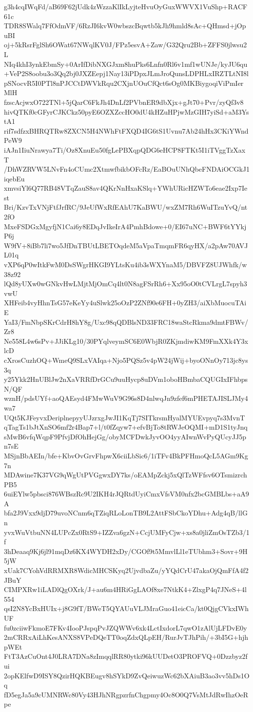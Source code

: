 g3h4cqIWqFd/aB69F62jUdk4zWzzaKlIkLyjteHvuOyGuxWWVX1VuShp+RACF61c
TDR8SWalq7FfOdmVF/6RzJI6kvW0wbszcBqwtb5kJh9hmld8sAc+QHmsd+jOpuBI
oj+5kRsrFglSh6OWat67NWqlKV0J/FPz5esvA+Zaw/G32Qru2Bb+ZFFS0jlwsu2L
NIq4khI3ynkEbmSy+0ArIfDibNXGJxm8huPks6Lnfn0Rl6v1mf1wUNJe/kyJU6qu
+VeP2S8oobu3o3Qq2bj0JXZEepj1Nay13iPDpxJLmJroQunsLDPHLxIRZTLtNI8l
pSNocvR5I0PTl8nPJCCtDWVkRqu2CXjnUOuCfQct6sOg0MKBiygoqiViPmIerMlH
fzscAcjwxO722TNl+5jQarC6FkJh4DnLf2PVbnER9dbXjx+gJt70+Pvr/zyQf3v8
hivQTKf0cGFyrCJKCkz50pyE6OZXZccHO0dU4kHZuHPjwMzGIH7yiSd+aM3YstA1
rif7sdfzxBHRQTRw8ZXCN5H4NWhFtFXQD4IG6tS1Uvnu7Ab24hHx3CKiYWndPeW9
iAJn1IiuNrawya7Ti/Oz8XnuEu50fgLePBXqpQDG6eHCP8FTKt5I1iTVggTzXaxT
/DhWZRVW5LNvFn4oCUmc2XtmwfbikbOFcRz/EaBOuUNhQbeFNDAiOCGkJ1iqebEu
xmvsiYl6Q77RB48VTqZauS8av4QKrNnHxaKSlq+YWhURicHZWTo6eae2Ixp7Iest
Bri/KzvTxVNjFtfJrfRC/9JeUfWxRfEAhU7KaBWU/wxZM7Rh6WuITzuYvQ/nt2fO
MxeFSDGxMgyfjN1Cai6y8EDqJvIkeIrA4PmhBdowe+0/EI67uNC+BWF6tYYkjP6j
W9fV+8iBb7li7wo5JfDnTBUtLBETOqdeM5aVpaTmqmFR6qyHX/a2pAw70AVJL01q
vXP6qP0wItkFwM0DsSWgrHKGI9YLtsKu4ib3sWXYnaM5/DBVFZ8UJWhfk/w38z92
lQd8yUXw0wGNkvHwLMjtMjOmCq4lt0N8agFSrRh6+Xx95oO0tCVLrgL7spyh3vwU
XHFeib4vyHhnTsG57eKeYy4uSlwk25oOzP2ZNf90e6FH+0yZH3/aiXbMuocuTAiE
YaI3/FmNbpSKrCdrH8hY8g/Uxc98qQDBlsND33FRC18waStcRkma9dmtFBWv/Zr8
Ne558L4w6sPv+JJiKLg10/30PYqlveymSC6E0WbjR0ZKjmdiwKM9FmXXk4Y3xlcD
cXrosCuzhOQ+WmeQ9SLxVAIqa+Njo5PQSz5v4pW24jWij+byoONnOy713jc8ys3q
y25Ykk2HnUBlJw2nXaVRRfDrGCu9uuHycp8uDVm1oboHBmbaCQUGIxIFhbpsN/QF
wznH/pdsUYf+aoQAEsyd4FMwWuV9G96s8D4nlwqJn9zfef6mPHETAJISLJMy4wa7
UQt5KJFeyvxDeriplnepyyUJzrxgJwJI1KqTj7SITkrsmHyalMYUEvpyq7s3MvnT
qTagTs1bJtXnSO6mf2r4Bap7+l/t0fZqyw7+efvBjTo8tRWJeOQMI+mD1S1tyJnq
sMwB6vfqWqpF9PfvjDfOhHejGg/obyMCFDwkJyvOO4yyAIwnWvPyQUcyJJ5pn7sE
MSjnBbAEIn/bfe+KbvOvGrvFhpwX6ciiLbSic6/1iTFv4BkPFHmoQcL5AGm9Kg7n
MDAwine7K37VG9qWgUtPVGgwxDY7ks/oEAMpZckj5xQlTzWFfsv6OTsmizrchPB5
6uiEYlw5pbsci876WBszRc9U2IKH4rJQRtdUyiCmxVfsVM0nfx2bcGMBLbs+aA9A
bfa2J9Vxx9djD79uvoNCnm6qTZiqRLoLonTB9L2AttFSbCkoYDhu+Adg4qB/llGn
yvxWuVtbuNN4LUPcZx0RtS9+IZZva6gzN+CcjUMFyCjw+xs8a0jliZmOsTZb3/1f
3hDeaaq9Kj6jl91mqDz6KX4WYDH2xDy/CGOf9t5MmvlLl1eTUbhm3+Sovr+9H5jW
xUak7CYohVdRRMXR8WdicMHCSKyq2UjvdbaZu/yYQdCrU47akaOjQmFfA4f2JBuY
CIMPXRw1iLADlQgOXrk/J+au6m4HRiGgLAOf8xe7NtkK4+ZlxgP4q7JNeS+4l554
qsI2N8YcBxHUIx+j8G9fT/BWeT5QYAUuVLJMraGuo41eicCa/kt0QjgCVkxIWhUF
fu0zciiwFkmoE7FKv4IooPJspqPvJZQWWv6xk4LctIxdorL7qwO1zAlUjLFDvE0y
2mCRRxAiLhKesANXS8VPeDQeTT0oqZdxQLpEH/RurJvTJhPih/+3bI5G+hjhpWEt
FtT3AzCuOnt4J0LRA7DNa8zImqqlRR80ytki96kUUDetO3PROFVQ+0Dzzbyz2fui
2opKElfwD9ISY8QzirHQKBEugv8hSYkD9ZvQeiwuzWc62bXAiuB3ao3vv5hDs1Oq
fD5egJa5a9cUMNRWc80Vy43HJhNRgpzrfnChgpmy4Oc8O0Q7VsMtJdRwIhzOeRpe
